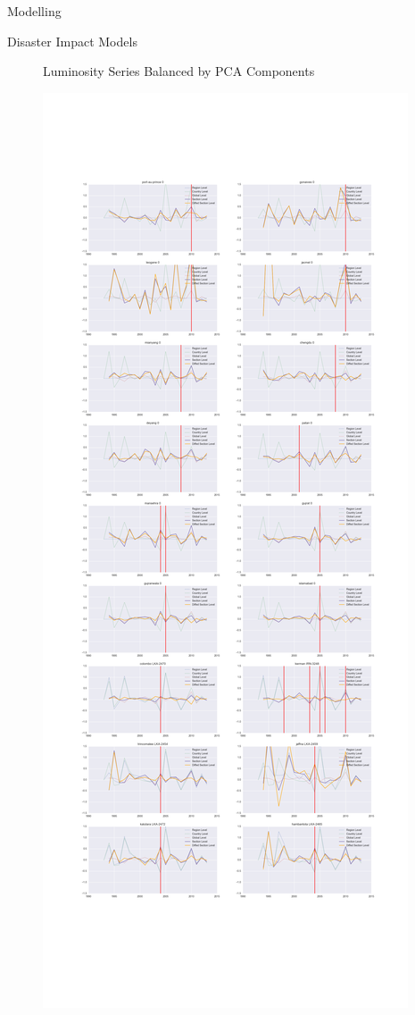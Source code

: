 \documentclass[12pt,fleqn,leqno,letterpaper]{article}
\begin{document}
\begin{section}{Modelling}
\begin{subsection}{Disaster Impact Models}
\begin{figure}[t!]
      \caption{Luminosity Series Balanced by PCA Components}
    \end{figure}
    \begin{figure}[t!]
      \centering
      \includegraphics[width=1\linewidth]{pca_balancer_diffs}\label{fig:pca_balanced_luminosity_sum_series} %

\end{figure}
\end{subsection}
\end{section}
\end{document}
